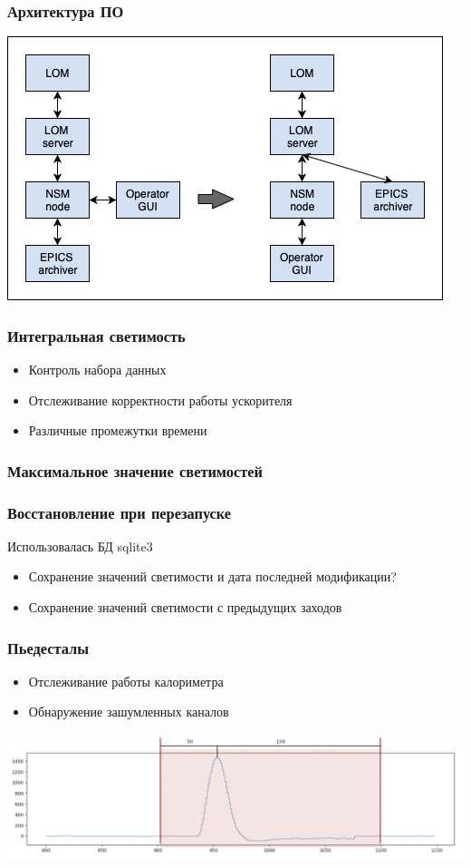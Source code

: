 \documentclass{beamer}
\begin{document}
\begin{frame}
\frametitle{Архитектура ПО}
\includegraphics[width=\textwidth]{Architecture_Scheme.jpg}
\end{frame}

\begin{frame}
\frametitle{Интегральная светимость}
    \begin{itemize}
        \item Контроль набора данных
        \item Отслеживание корректности работы ускорителя
        \item Различные промежутки времени
    \end{itemize}
\end{frame}

\begin{frame}
\frametitle{Максимальное значение светимостей}

\end{frame}

\begin{frame}
\frametitle{Восстановление при перезапуске}
    Использовалась БД sqlite3
    \begin{itemize}
        \item Сохранение значений светимости и дата последней модификации?
        \item Сохранение значений светимости с предыдущих заходов
    \end{itemize}
\end{frame}

\begin{frame}
\frametitle{Пьедесталы}
    \begin{itemize}
        \item Отслеживание работы калориметра
        \item Обнаружение зашумленных каналов
    \end{itemize}
    \includegraphics[width=\textwidth]{Pedestal.png}
\end{frame}
\end{document}
